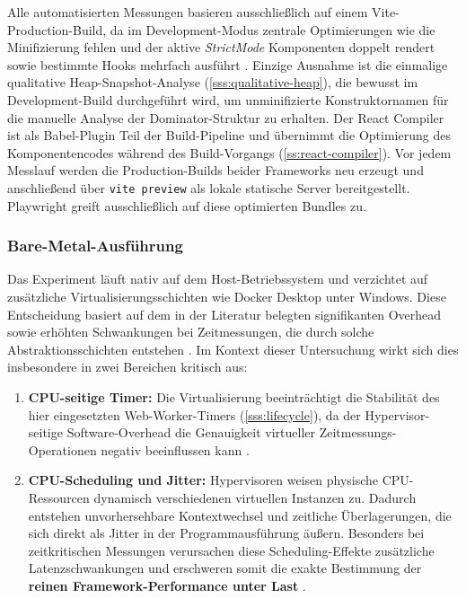 Alle automatisierten Messungen basieren ausschließlich auf einem Vite-Production-Build, da im Development-Modus zentrale Optimierungen wie die Minifizierung fehlen \cite{vite-why} und der aktive \textit{StrictMode} Komponenten doppelt rendert sowie bestimmte Hooks mehrfach ausführt \cite{react_strictmode}. Einzige Ausnahme ist die einmalige qualitative Heap-Snapshot-Analyse (\cref{sss:qualitative-heap}), die bewusst im Development-Build durchgeführt wird, um unminifizierte Konstruktornamen für die manuelle Analyse der Dominator-Struktur zu erhalten. Der React Compiler ist als Babel-Plugin Teil der Build-Pipeline und übernimmt die Optimierung des Komponentencodes während des Build-Vorgangs (\cref{ss:react-compiler}). Vor jedem Messlauf werden die Production-Builds beider Frameworks neu erzeugt und anschließend über \texttt{vite preview} als lokale statische Server bereitgestellt. Playwright greift ausschließlich auf diese optimierten Bundles zu. 

\subsubsection{Bare-Metal-Ausführung}
\label{sss:bare-metal}

Das Experiment läuft nativ auf dem Host-Betriebssystem und verzichtet auf zusätzliche Virtualisierungsschichten wie Docker Desktop unter Windows. Diese Entscheidung basiert auf dem in der Literatur belegten signifikanten Overhead sowie erhöhten Schwankungen bei Zeitmessungen, die durch solche Abstraktionsschichten entstehen \cite{kirova-virtualization-2019}. Im Kontext dieser Untersuchung wirkt sich dies insbesondere in zwei Bereichen kritisch aus:
\begin{enumerate}
	\item \textbf{CPU-seitige Timer:} Die Virtualisierung beeinträchtigt die Stabilität des hier eingesetzten Web-Worker-Timers (\cref{sss:lifecycle}), da der Hypervisor-seitige Software-Overhead die Genauigkeit virtueller Zeitmessungs-Operationen negativ beeinflussen kann \cite{kirova-virtualization-2019}.
    \item \textbf{CPU-Scheduling und Jitter:} Hypervisoren weisen physische CPU-Ressourcen dynamisch verschiedenen virtuellen Instanzen zu. Dadurch entstehen unvorhersehbare Kontextwechsel und zeitliche Überlagerungen, die sich direkt als Jitter in der Programmausführung äußern. Besonders bei zeitkritischen Messungen verursachen diese Scheduling-Effekte zusätzliche Latenzschwankungen und erschweren somit die exakte Bestimmung der \textbf{reinen Framework-Performance unter Last} \cite{kirova-virtualization-2019}.
\end{enumerate}

